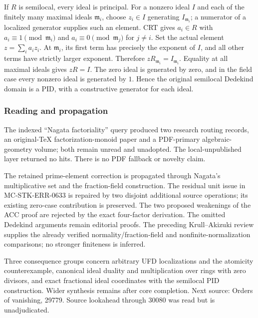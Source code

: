 If \(R\) is semilocal, every ideal is principal. For a nonzero ideal \(I\) and each of the finitely many maximal ideals \(\mathfrak m_i\), choose \(z_i\in I\) generating \(I_{\mathfrak m_i}\); a numerator of a localized generator supplies such an element. CRT gives \(a_i\in R\) with \(a_i\equiv1\pmod{\mathfrak m_i}\) and \(a_i\equiv0\pmod{\mathfrak m_j}\) for \(j\ne i\). Set the actual element \(z=\sum_i a_i z_i\). At \(\mathfrak m_i\), its first term has precisely the exponent of \(I\), and all other terms have strictly larger exponent. Therefore \(zR_{\mathfrak m_i}=I_{\mathfrak m_i}\). Equality at all maximal ideals gives \(zR=I\). The zero ideal is generated by zero, and in the field case every nonzero ideal is generated by \(1\). Hence the original semilocal Dedekind domain is a PID, with a constructive generator for each ideal.

\subsubsection{Reading and propagation}\label{algebra-proof-029-reading-and-propagation}

The indexed ``Nagata factoriality'' query produced two research routing records, an original-TeX factorization-monoid paper and a PDF-primary algebraic-geometry volume; both remain unread and unadopted. The local-unpublished layer returned no hits. There is no PDF fallback or novelty claim.

The retained prime-element correction is propagated through Nagata's multiplicative set and the fraction-field construction. The residual unit issue in MC-STK-ERR-0633 is repaired by two disjoint additional source operations; its existing zero-case contribution is preserved. The two proposed weakenings of the ACC proof are rejected by the exact four-factor derivation. The omitted Dedekind arguments remain editorial proofs. The preceding Krull--Akizuki review supplies the already verified normality/fraction-field and nonfinite-normalization comparisons; no stronger finiteness is inferred.

Three consequence groups concern arbitrary UFD localizations and the atomicity counterexample, canonical ideal duality and multiplication over rings with zero divisors, and exact fractional ideal coordinates with the semilocal PID construction. Wider synthesis remains after core completion. Next source: Orders of vanishing, 29779. Source lookahead through 30080 was read but is unadjudicated.
